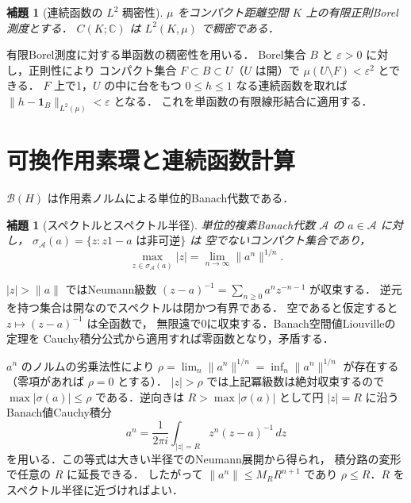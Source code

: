 \documentclass[a5paper,10pt,onecolumn]{jsarticle}
\makeatletter
\theoremstyle{mathnotetheorem}
\newtheorem{lemma}[theorem]{補題}
\renewcommand{\proofname}{証明}
\renewenvironment{proof}[1][\proofname]{%
  \par\pushQED{\qed}\normalfont\topsep4\p@\@plus2\p@\relax
  \trivlist\item[\hskip\labelsep\bfseries #1]\ignorespaces
}{\popQED\endtrivlist\@endpefalse}
\newcommand{\norm}[1]{\lVert #1\rVert}
\makeatother
\begin{document}
\begin{lemma}[連続函数の $L^2$ 稠密性]
$\mu$ をコンパクト距離空間 $K$ 上の有限正則Borel測度とする．
$C(K;\mathbb C)$ は $L^2(K,\mu)$ で稠密である．
\end{lemma}
\begin{proof}
有限Borel測度に対する単函数の稠密性を用いる．
Borel集合 $B$ と $\varepsilon>0$ に対し，正則性により
コンパクト集合 $F\subset B\subset U$（$U$ は開）で
$\mu(U\setminus F)<\varepsilon^2$ とできる．
$F$ 上で1，$U$ の中に台をもつ $0\le h\le1$ なる連続函数を取れば
$\norm{h-\mathbf1_B}_{L^2(\mu)}<\varepsilon$ となる．
これを単函数の有限線形結合に適用する．
\end{proof}

\section{可換作用素環と連続函数計算}
$\mathcal B(H)$ は作用素ノルムによる単位的Banach代数である．

\begin{lemma}[スペクトルとスペクトル半径]
単位的複素Banach代数 $\mathcal A$ の $a\in\mathcal A$ に対し，
$\sigma_{\mathcal A}(a)=\{z:z1-a\text{ は非可逆}\}$ は
空でないコンパクト集合であり，
\[
 \max_{z\in\sigma_{\mathcal A}(a)}|z|
   =\lim_{n\to\infty}\norm{a^n}^{1/n}.
\]
\end{lemma}
\begin{proof}
$|z|>\norm a$ ではNeumann級数
$(z-a)^{-1}=\sum_{n\ge0}a^nz^{-n-1}$ が収束する．
逆元を持つ集合は開なのでスペクトルは閉かつ有界である．
空であると仮定すると $z\mapsto(z-a)^{-1}$ は全函数で，
無限遠で0に収束する．Banach空間値Liouvilleの定理を
Cauchy積分公式から適用すれば零函数となり，矛盾する．

$a^n$ のノルムの劣乗法性により
$\rho=\lim_n\norm{a^n}^{1/n}=\inf_n\norm{a^n}^{1/n}$ が存在する
（零項があれば $\rho=0$ とする）．
$|z|>\rho$ では上記冪級数は絶対収束するので
$\max|\sigma(a)|\le\rho$ である．逆向きは
$R>\max|\sigma(a)|$ として円 $|z|=R$ に沿う
Banach値Cauchy積分
\[
 a^n=\frac1{2\pi i}\int_{|z|=R}z^n(z-a)^{-1}\,dz
\]
を用いる．この等式は大きい半径でのNeumann展開から得られ，
積分路の変形で任意の $R$ に延長できる．
したがって $\norm{a^n}\le M_RR^{n+1}$ であり
$\rho\le R$．$R$ をスペクトル半径に近づければよい．
\end{proof}
\end{document}
